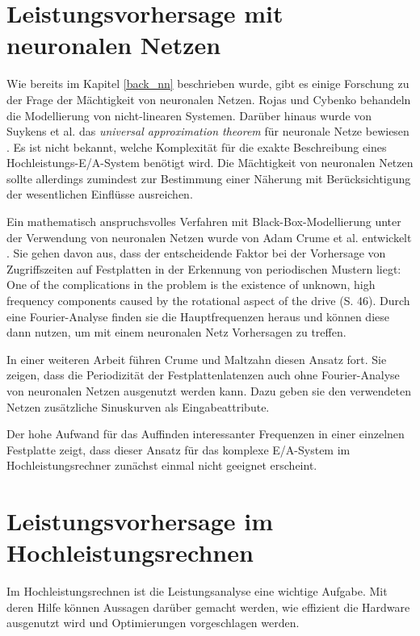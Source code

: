 \documentclass[
	12pt,
	a4paper,
	BCOR10mm,
	DIV14,
	listof=totoc,
	bibliography=totoc,
	headsepline
]{scrreprt}
\begin{document}
\section{Leistungsvorhersage mit neuronalen Netzen}
\label{rel_vorhersage-mit-nn}
Wie bereits im Kapitel \ref{back_nn} beschrieben wurde, gibt es einige Forschung zu der Frage der Mächtigkeit von neuronalen Netzen. Rojas \cite{Rojas:1996:NNS:235222} und  Cybenko \cite{cybenko:mcss} behandeln die Modellierung von nicht-linearen Systemen. Darüber hinaus wurde von Suykens et al. das \textit{universal approximation theorem} für neuronale Netze bewiesen \cite{suykens2012artificial}. Es ist nicht bekannt, welche Komplexität für die exakte Beschreibung eines Hochleistungs-E/A-System benötigt wird. Die Mächtigkeit von neuronalen Netzen sollte allerdings zumindest zur Bestimmung einer Näherung mit Berücksichtigung der wesentlichen Einflüsse ausreichen.

Ein mathematisch anspruchsvolles Verfahren mit Black-Box-Modellierung unter der Verwendung von neuronalen Netzen wurde von Adam Crume et al. entwickelt \cite{Crume:2013:FML:2538542.2538561}. Sie gehen davon aus, dass der entscheidende Faktor bei der Vorhersage von Zugriffszeiten auf Festplatten in der Erkennung von periodischen Mustern liegt: \glqq One of the complications in the problem is the existence of unknown, high frequency components caused by the rotational aspect of the drive\grqq{} \cite{Crume:2013:FML:2538542.2538561} (S. 46).
Durch eine Fourier-Analyse finden sie die Hauptfrequenzen heraus und können diese dann nutzen, um mit einem neuronalen Netz Vorhersagen zu treffen.

In einer weiteren Arbeit führen Crume und Maltzahn diesen Ansatz fort. Sie zeigen, dass die Periodizität der Festplattenlatenzen auch ohne Fourier-Analyse von neuronalen Netzen ausgenutzt werden kann. Dazu geben sie den verwendeten Netzen zusätzliche Sinuskurven als Eingabeattribute. \cite{crumeadammaltzahncarlos2015}

Der hohe Aufwand für das Auffinden interessanter Frequenzen in einer einzelnen Festplatte zeigt, dass dieser Ansatz für das komplexe E/A-System im Hochleistungsrechner zunächst einmal nicht geeignet erscheint.

\section{Leistungsvorhersage im Hochleistungsrechnen}
\label{rel_vorhersage_im-hpc}
Im Hochleistungsrechnen ist die Leistungsanalyse eine wichtige Aufgabe. Mit deren Hilfe können Aussagen darüber gemacht werden, wie effizient die Hardware ausgenutzt wird und Optimierungen vorgeschlagen werden. 
\end{document}

